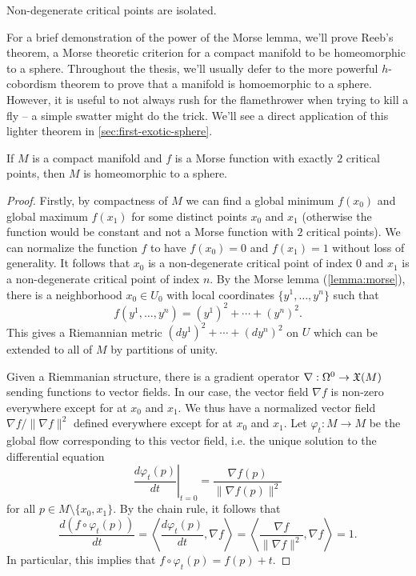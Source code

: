 \begin{corollary}
	Non-degenerate critical points are isolated.
\end{corollary}

For a brief demonstration of the power of the Morse lemma, we'll prove Reeb's theorem, a Morse theoretic criterion for a compact manifold to be homeomorphic to a sphere. Throughout the thesis, we'll usually defer to the more powerful $h$-cobordism theorem to prove that a manifold is homoemorphic to a sphere. However, it is useful to not always rush for the flamethrower when trying to kill a fly -- a simple swatter might do the trick. We'll see a direct application of this lighter theorem in \cref{sec:first-exotic-sphere}.

\begin{theorem}[Reeb]\label{thm:reeb}
	If $M$ is a compact manifold and $f$ is a Morse function with exactly $2$ critical points, then $M$ is homeomorphic to a sphere.
\end{theorem}
\begin{proof}
	Firstly, by compactness of $M$ we can find a global minimum $f(x_0)$ and global maximum $f(x_1)$ for some distinct points $x_0$ and $x_1$ (otherwise the function would be constant and not a Morse function with $2$ critical points). We can normalize the function $f$ to have $f(x_0)=0$ and $f(x_1)=1$ without loss of generality. It follows that $x_0$ is a non-degenerate critical point of index 0 and $x_1$ is a non-degenerate critical point of index $n$.
	By the Morse lemma (\ref{lemma:morse}), there is a neighborhood $x_0\in U_0$ with local coordinates $\{y^1,\ldots, y^n\}$ such that 
	\[
			f(y^1,\ldots, y^n) = (y^1)^2 + \cdots + (y^n)^2.
	\]
	This gives a Riemannian metric $(dy^1)^2+\cdots+(dy^n)^2$ on $U$ which can be extended to all of $M$ by partitions of unity.

	Given a Riemmanian structure, there is a gradient operator $\nabla : \Omega^0 \to \mathfrak{X}(M)$ sending functions to vector fields.
	In our case, the vector field $\nabla f$ is non-zero everywhere except for at $x_0$ and $x_1$. We thus have a normalized vector field $\nabla f/\|\nabla f\|^2$
	defined everywhere except for at $x_0$ and $x_1$. Let $\varphi_t : M \to M$ be the global flow corresponding to this vector field, i.e. the unique solution to the differential equation
	\[
	\left.\frac{d\varphi_t(p)}{dt}\right|_{t=0} = \frac{\nabla f(p)}{\|\nabla f(p)\|^2}
	\]
	for all $p\in M\setminus \{x_0,x_1\}$. By the chain rule, it follows that
	\[
		\frac{d(f\circ \varphi_t(p))}{dt}=\left\langle \frac{d\varphi_t(p)}{dt}, \nabla f\right\rangle = \left\langle \frac{\nabla f}{\|\nabla f\|^2}, \nabla f\right\rangle=1.
	\]
	In particular, this implies that $f\circ \varphi_t(p) = f(p)+t$. 

\end{proof}

